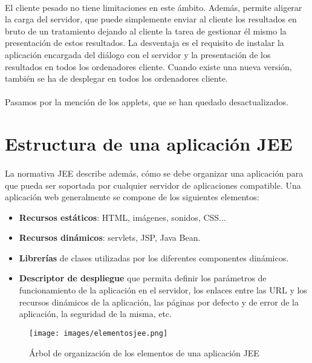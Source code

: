 \documentclass{article}
\begin{document}
	\paragraph{}El cliente pesado no tiene limitaciones en este ámbito. Además, permite aligerar la carga del servidor, que puede simplemente enviar al cliente los resultados en bruto de un tratamiento dejando al cliente la tarea de gestionar él mismo la presentación de estos resultados. La desventaja es el requisito de instalar la aplicación encargada del diálogo con el servidor y la presentación de los resultados en todos los ordenadores cliente. Cuando existe una nueva versión, también se ha de desplegar en todos los ordenadores cliente.
	
	\paragraph{}Pasamos por la mención de los applets, que se han quedado desactualizados.
	
	\section{Estructura de una aplicación JEE}
	
	\paragraph{}La normativa JEE describe además, cómo se debe organizar una aplicación para que pueda ser soportada por cualquier servidor de aplicaciones compatible. Una aplicación web generalmente se compone de los siguientes elementos:
	
	\begin{itemize}
		\item \textbf{Recursos estáticos}: HTML, imágenes, sonidos, CSS...
		\item \textbf{Recursos dinámicos}: servlets, JSP, Java Bean.
		\item \textbf{Librerías} de clases utilizadas por los diferentes componentes dinámicos.
		\item \textbf{Descriptor de despliegue} que permita definir los parámetros de funcionamiento de la aplicación en el servidor, los enlaces entre las URL y los recursos dinámicos de la aplicación, las páginas por defecto y de error de la aplicación, la seguridad de la misma, etc.
	\end{itemize}
	
	\begin{figure}[H]
		\centering
		\texttt{[image: images/elementosjee.png]}
		\caption{\label{fig4}Árbol de organización de los elementos de una aplicación JEE}
	\end{figure}
\end{document}
